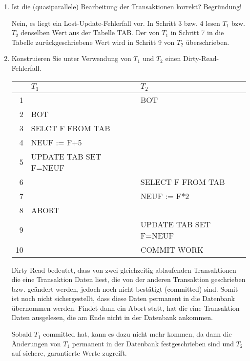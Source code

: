 \documentclass{bschlangaul-aufgabe}
\begin{document}
\begin{enumerate}

%

\item Ist die (quasiparallele) Bearbeitung der Transaktionen korrekt?
Begründung!

\begin{liAntwort}
Nein, es liegt ein Lost-Update-Fehlerfall vor. In Schritt 3 bzw. 4 lesen
$T_1$ bzw. $T_2$ denselben Wert aus der Tabelle TAB. Der von $T_1$ in
Schritt 7 in die Tabelle zurückgeschriebene Wert wird in Schritt 9 von
$T_2$ überschrieben.
\end{liAntwort}

%

\item Konstruieren Sie unter Verwendung von $T_1$ und $T_2$ einen
Dirty-Read-Fehlerfall.

\begin{liAntwort}

\begin{center}
\begin{tabular}{|r|l|l|}
\hline
   & $T_1$                 & $T_2$                 \\\hline\hline
1  &                       & BOT                   \\\hline
2  & BOT                   &                       \\\hline
3  & SELCT F FROM TAB      &                       \\\hline
4  & NEUF := F+5           &                       \\\hline
5  & UPDATE TAB SET F=NEUF &                       \\\hline
6  &                       & SELECT F FROM TAB     \\\hline
7  &                       & NEUF := F*2           \\\hline
8  & ABORT                 &                       \\\hline
9  &                       & UPDATE TAB SET F=NEUF \\\hline
10 &                       & COMMIT WORK           \\\hline
\end{tabular}
\end{center}

Dirty-Read bedeutet, dass von zwei gleichzeitig ablaufenden
Transaktionen die eine Transaktion Daten liest, die von der anderen
Transaktion geschrieben bzw. geändert werden, jedoch noch nicht
bestätigt (committed) sind. Somit ist noch nicht sichergestellt, dass
diese Daten permanent in die Datenbank übernommen werden. Findet dann
ein Abort statt, hat die eine Transaktion Daten ausgelesen, die am Ende
nicht in der Datenbank ankommen.

Sobald $T_1$ committed hat, kann es dazu nicht mehr kommen, da dann die
Änderungen von $T_1$ permanent in der Datenbank festgeschrieben sind und
$T_2$ auf sichere, garantierte Werte zugreift.
\end{liAntwort}
\end{enumerate}
\end{document}
